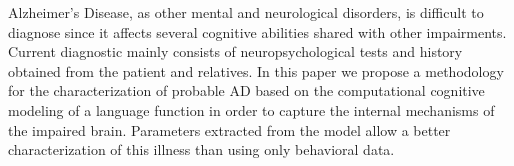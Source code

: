 Alzheimer's Disease, as other mental and neurological disorders, is difficult to diagnose since it affects several cognitive abilities shared with other impairments. Current diagnostic mainly consists of neuropsychological tests and history obtained from the patient and relatives. In this paper we propose a methodology for the characterization of probable AD based on the computational cognitive modeling of a language function in order to capture the internal mechanisms of the impaired brain. Parameters extracted from the model allow a better characterization of this illness than using only behavioral data.
